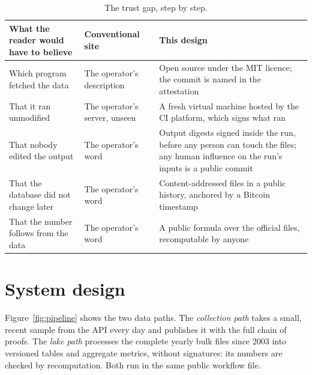 \begin{table}[t]
\centering
\small
\begin{tabularx}{\textwidth}{@{}>{\raggedright\arraybackslash}p{4.3cm}>{\raggedright\arraybackslash}p{4.6cm}>{\raggedright\arraybackslash}X@{}}
\toprule
What the reader would have to believe & Conventional site & This design \\
\midrule
Which program fetched the data & The operator's description & Open source under the MIT licence; the commit is named in the attestation \\
\addlinespace[3pt]
That it ran unmodified & The operator's server, unseen & A fresh virtual machine hosted by the CI platform, which signs what ran \\
\addlinespace[3pt]
That nobody edited the output & The operator's word & Output digests signed inside the run, before any person can touch the files; any human influence on the run's inputs is a public commit \\
\addlinespace[3pt]
That the database did not change later & The operator's word & Content-addressed files in a public history, anchored by a Bitcoin timestamp \\
\addlinespace[3pt]
That the number follows from the data & The operator's word & A public formula over the official files, recomputable by anyone \\
\bottomrule
\end{tabularx}
\caption{The trust gap, step by step.}
\label{tab:gap}
\end{table}

\section{System design}
\label{sec:design}

Figure~\ref{fig:pipeline} shows the two data paths. The \emph{collection path} takes a small, recent sample from the API every day and publishes it with the full chain of proofs. The \emph{lake path} processes the complete yearly bulk files since 2003 into versioned tables and aggregate metrics, without signatures: its numbers are checked by recomputation. Both run in the same public workflow file.

